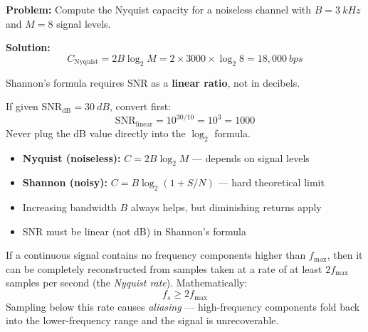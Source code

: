 \documentclass[main.tex]{subfiles}
\begin{document}
\begin{questionanswerbox}
\textbf{Problem:} Compute the Nyquist capacity for a noiseless channel with
$B = 3\ \unit{kHz}$ and $M = 8$ signal levels.

\medskip
\textbf{Solution:}
\[
    C_{\text{Nyquist}} = 2B\log_2 M = 2 \times 3000 \times \log_2 8 = 18{,}000\ \unit{bps}
\]
\end{questionanswerbox}

\vspace{6pt}

\begin{alertbox}
Shannon's formula requires SNR as a \textbf{linear ratio}, not in decibels.

\medskip
If given $\text{SNR}_{\text{dB}} = 30\ \unit{dB}$, convert first:
\[
    \text{SNR}_{\text{linear}} = 10^{30/10} = 10^3 = 1000
\]
\Imp Never plug the dB value directly into the $\log_2$ formula.
\end{alertbox}

\vspace{6pt}

\begin{summarybox}
\begin{itemize}
    \item \textbf{Nyquist (noiseless):} $C = 2B\log_2 M$ — depends on signal levels
    \item \textbf{Shannon (noisy):} $C = B\log_2(1+S/N)$ — hard theoretical limit
    \item Increasing bandwidth $B$ always helps, but diminishing returns apply
    \item SNR must be linear (not dB) in Shannon's formula
\end{itemize}
\end{summarybox}

\vspace{6pt}

\begin{theorembox}
If a continuous signal contains no frequency components higher than $f_{\max}$,
then it can be completely reconstructed from samples taken at a rate of at least
$2f_{\max}$ samples per second (the \emph{Nyquist rate}).
Mathematically:
\[
    f_s \geq 2 f_{\max}
\]
Sampling below this rate causes \emph{aliasing} — high-frequency components fold
back into the lower-frequency range and the signal is unrecoverable.
\end{theorembox}
\end{document}
